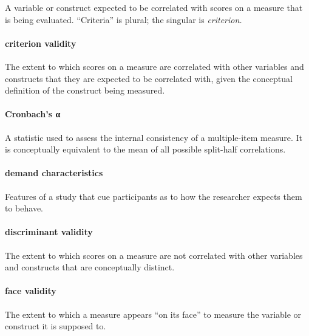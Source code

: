 \documentclass[
]{krantz}
\begin{document}
A variable or construct expected to be correlated with scores on a measure that is being evaluated. ``Criteria'' is plural; the singular is \emph{criterion.}

\paragraph*{criterion validity}\label{criterion-validity-1}

The extent to which scores on a measure are correlated with other variables and constructs that they are expected to be correlated with, given the conceptual definition of the construct being measured.

\paragraph*{Cronbach's α}\label{cronbachs-ux3b1}

A statistic used to assess the internal consistency of a multiple-item measure. It is conceptually equivalent to the mean of all possible split-half correlations.

\paragraph*{demand characteristics}\label{demand-characteristics}

Features of a study that cue participants as to how the researcher expects them to behave.

\paragraph*{discriminant validity}\label{discriminant-validity-1}

The extent to which scores on a measure are not correlated with other variables and constructs that are conceptually distinct.

\paragraph*{face validity}\label{face-validity-1}

The extent to which a measure appears ``on its face'' to measure the variable or construct it is supposed to.
\end{document}
